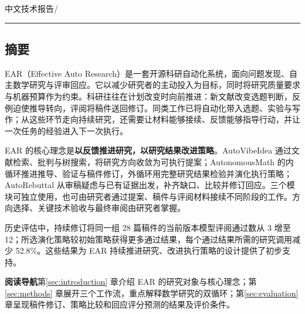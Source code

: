 \hfill{\sffamily\footnotesize\color{muted}中文技术报告\quad /}\par
\vspace{1mm}\par
\vspace{4mm}\par
\vspace{4mm}\noindent\AuthorsCompact
\vspace{3mm}\noindent\textcolor{navy!35}{\rule{\textwidth}{.5pt}}\par
\vspace{1mm}\subsection*{摘要}
EAR（Effective Auto Research）是一套开源科研自动化系统，面向问题发现、自主数学研究与评审回应。它以减少研究者的主动投入为目标，同时将研究质量要求与机器预算作为约束。科研往往在计划改变时向前推进：新文献改变选题判断，反例迫使推导转向，评阅将稿件送回修订。同类工作已将自动化带入选题、实验与写作；从这些环节走向持续研究，还需要让材料能够接续、反馈能够指导行动，并让一次任务的经验进入下一次执行。

EAR 的核心理念是\textbf{以反馈推进研究，以研究结果改进策略}。AutoVibeIdea 通过文献检索、批判与树搜索，将研究方向收敛为可执行提案；AutonomousMath 的内循环推进推导、验证与稿件修订，外循环用完整研究结果检验并演化执行策略；AutoRebuttal 从审稿疑虑与已有证据出发，补齐缺口、比较并修订回应。三个模块可独立使用，也可由研究者通过提案、稿件与评阅材料接续不同阶段的工作。方向选择、关键技术验收与最终审阅由研究者掌握。

历史评估中，持续修订将同一组 28 篇稿件的当前版本模型评阅通过数从 3 增至 12；所选演化策略较初始策略获得更多通过结果，每个通过结果所需的研究调用减少 52.8\%。这些结果为 EAR 持续推进研究、改进执行策略的设计提供了初步支持。

\vspace{3mm}
\par
\clearpage
{}
\par
\vspace{2mm}
\tableofcontents
\thispagestyle{fancy}
\vspace{8mm}
\begin{scope}
\textbf{阅读导航}\quad 第\ref{sec:introduction} 章介绍 EAR 的研究对象与核心理念；第\ref{sec:methods} 章展开三个工作流，重点解释数学研究的双循环；第\ref{sec:evaluation} 章呈现稿件修订、策略比较和回应评分预测的结果及评价条件。
\end{scope}
\clearpage
